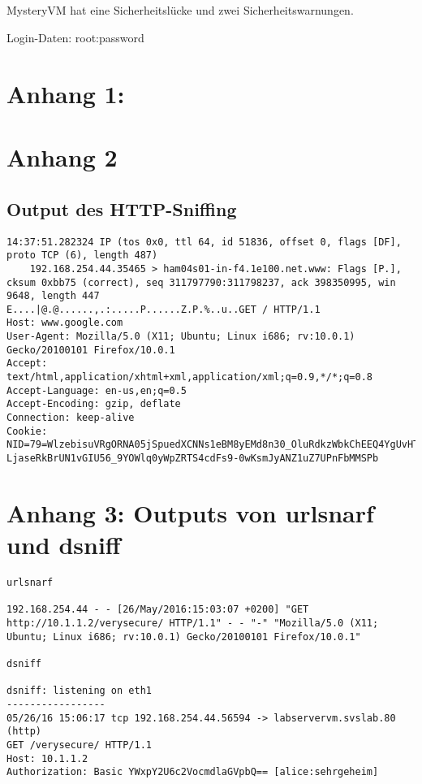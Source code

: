 \documentclass[twoside]{article}
\begin{document}
\subsection{}
MysteryVM hat eine Sicherheitslücke und zwei Sicherheitswarnungen.

Login-Daten: root:password
\subsection{}

\newpage
\section*{Anhang 1:}


\section*{Anhang 2}
\subsection*{Output des HTTP-Sniffing}
\begin{lstlisting}
14:37:51.282324 IP (tos 0x0, ttl 64, id 51836, offset 0, flags [DF], proto TCP (6), length 487)
    192.168.254.44.35465 > ham04s01-in-f4.1e100.net.www: Flags [P.], cksum 0xbb75 (correct), seq 311797790:311798237, ack 398350995, win 9648, length 447
E....|@.@......,.:.....P......Z.P.%..u..GET / HTTP/1.1
Host: www.google.com
User-Agent: Mozilla/5.0 (X11; Ubuntu; Linux i686; rv:10.0.1) Gecko/20100101 Firefox/10.0.1
Accept: text/html,application/xhtml+xml,application/xml;q=0.9,*/*;q=0.8
Accept-Language: en-us,en;q=0.5
Accept-Encoding: gzip, deflate
Connection: keep-alive
Cookie: NID=79=WlzebisuVRgORNA05jSpuedXCNNs1eBM8yEMd8n30_OluRdkzWbkChEEQ4YgUvHTWB3a64hs LjaseRkBrUN1vGIU56_9YOWlq0yWpZRTS4cdFs9-0wKsmJyANZ1uZ7UPnFbMMSPb
\end{lstlisting}

\section*{Anhang 3: Outputs von urlsnarf und dsniff}
\begin{lstlisting}
urlsnarf

192.168.254.44 - - [26/May/2016:15:03:07 +0200] "GET http://10.1.1.2/verysecure/ HTTP/1.1" - - "-" "Mozilla/5.0 (X11; Ubuntu; Linux i686; rv:10.0.1) Gecko/20100101 Firefox/10.0.1"

dsniff

dsniff: listening on eth1
-----------------
05/26/16 15:06:17 tcp 192.168.254.44.56594 -> labservervm.svslab.80 (http)
GET /verysecure/ HTTP/1.1
Host: 10.1.1.2
Authorization: Basic YWxpY2U6c2VocmdlaGVpbQ== [alice:sehrgeheim] 
\end{lstlisting}
\end{document}
